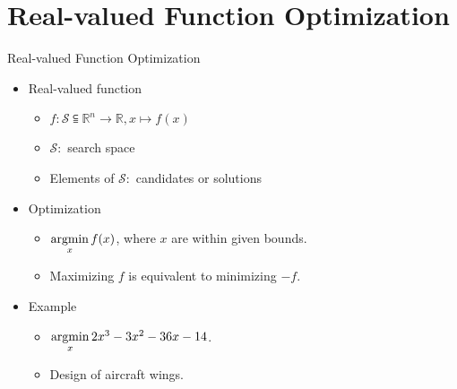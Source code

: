 \newcommand{\argmin}{\operatornamewithlimits{argmin}}

\section{Real-valued Function Optimization}

\begin{frame}{Real-valued Function Optimization}
  \begin{itemize}
    \item{Real-valued function}
      \begin{itemize}
        \item $f \colon \mathcal{S} \subseteqq \mathbb{R}^n \to
          \mathbb{R},x \mapsto f(x)$
        \item $\mathcal{S} \colon $ search space
        \item Elements of $\mathcal{S} \colon $ candidates or solutions
      \end{itemize}
    \item{Optimization}
      \begin{itemize}
        \item $\argmin\limits_{x} f(x)$, where $x$ are within given bounds.
        \item Maximizing $f$ is equivalent to minimizing $-f$.
      \end{itemize}
    \item Example
      \begin{itemize}
        \item $\argmin\limits_x 2x^3-3x^2-36x-14$.
        \item Design of aircraft wings.
      \end{itemize}
  \end{itemize}
\end{frame}

